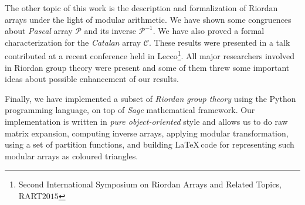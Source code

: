  The other topic of
this work is the description and formalization of Riordan arrays under the
light of modular arithmetic. We have shown some congruences about \emph{Pascal}
array $\mathcal{P}$ and its inverse $\mathcal{P}^{-1}$. We have also proved a
formal characterization for the \emph{Catalan} array $\mathcal{C}$. These
results were presented in a talk contributed at a recent conference held in
Lecco\footnote{Second International Symposium on Riordan Arrays and Related
Topics, RART$2015$}. All major researchers involved in Riordan group theory
were present and some of them threw some important ideas about possible
enhancement of our results.  

Finally, we have implemented a subset of \emph{Riordan group theory} using the
Python programming language, on top of \emph{Sage} mathematical framework.  Our
implementation is written in \emph{pure object-oriented} style and allows us to
do raw matrix expansion, computing inverse arrays, applying modular
    transformation, using a set of partition functions, and building \LaTeX\,code
    for representing such modular arrays as coloured triangles.
\fi

\iffalse
\vfill

\pdfbookmark[1]{Zusammenfassung}{Zusammenfassung}
\chapter*{Zusammenfassung}
Kurze Zusammenfassung des Inhaltes in deutscher Sprache\dots
\fi


\endgroup			

\vfill
